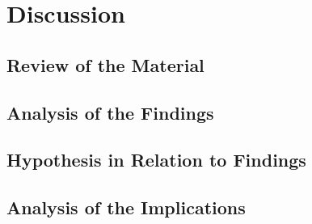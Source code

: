 \chapter{Discussion}

\section{Review of the Material}

\section{Analysis of the Findings}

\section{Hypothesis in Relation to Findings}

\section{Analysis of the Implications}